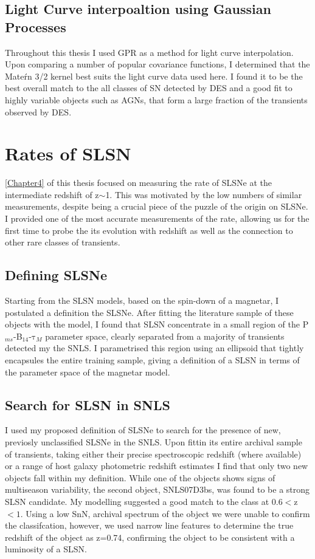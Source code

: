 \subsection{Light Curve interpoaltion using Gaussian Processes}
Throughout this thesis I used GPR as a method for light curve interpolation. Upon comparing a number of popular covariance functions, I determined that the Mate\'rn 3/2 kernel best suits the light curve data used here. I found it to be the best overall match to the all classes of SN detected by DES and a good fit to highly variable objects such as AGNs, that form a large fraction of the transients observed by DES. 

\section{Rates of SLSN}
\cref{Chapter4} of this thesis focused on measuring the rate of SLSNe at the intermediate redshift of z$\sim$1. This was motivated by the low numbers of similar measurements, despite being a crucial piece of the puzzle of the origin on SLSNe. I provided one of the most accurate measurements of the rate, allowing us for the first time to probe the its evolution with redshift as well as the connection to other rare classes of transients.

\subsection{Defining SLSNe}
Starting from the SLSN models, based on the spin-down of a magnetar, I postulated a definition the SLSNe. After fitting the literature sample of these objects with the model, I found that SLSN concentrate in a small region of the P$_{ms}$-B$_{14}$-$\mathrm{\tau}_M$ parameter space, clearly separated from a majority of transients detected my the SNLS. I parametrised this region using an ellipsoid that tightly encapsules the entire training sample, giving a definition of a SLSN in terms of the parameter space of the magnetar model.

\subsection{Search for SLSN in SNLS}
I used my proposed definition of SLSNe to search for the presence of new, previosly unclassified SLSNe in the SNLS. Upon fittin its entire archival sample of transients, taking either their precise spectroscopic redshift (where available) or a range of host galaxy photometric redshift estimates I find that only two new objects fall within my definition. While one of the objects shows signs of multiseason variability, the second object, SNLS07D3bs, was found to be a strong SLSN candidate. My modelling suggested a good match to the class at 0.6$<$z$<1$. Using a low Sn\/N, archival spectrum of the object we were unable to confirm the classifcation, however, we used narrow line features to determine the true redshift of the object as z=0.74, confirming the object to be consistent with a luminosity of a SLSN.

